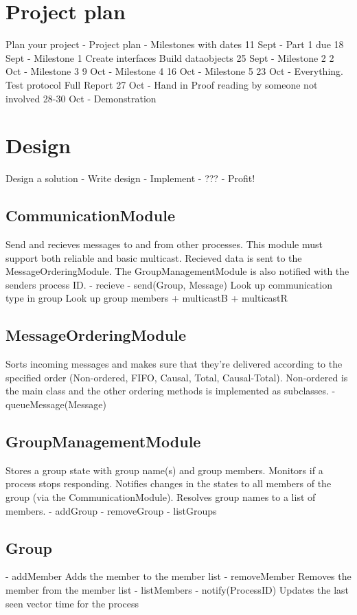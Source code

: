 \documentclass[11pt,swedish]{article}
\begin{document}
\section{Project plan}
Plan your project
- Project plan
- Milestones with dates
	11 Sept		- Part 1 due
	18 Sept		- Milestone 1
					Create interfaces
					Build dataobjects
	25 Sept		- Milestone 2
	2 Oct		- Milestone 3
	9 Oct		- Milestone 4
	16 Oct		- Milestone 5
	23 Oct		- Everything.
		Test protocol
		Full Report
	27 Oct 		- Hand in
		Proof reading by someone not involved
	28-30 Oct 	- Demonstration

\section{Design}
Design a solution
- Write design
- Implement
- ???
- Profit!


\subsection{CommunicationModule}
Send and recieves messages to and from other processes. This module must support both reliable and basic multicast. Recieved data is sent to the MessageOrderingModule. The GroupManagementModule is also notified with the senders process ID. 
- recieve
- send(Group, Message)
	Look up communication type in group
	Look up group members
+ multicastB
+ multicastR


\subsection{MessageOrderingModule}
Sorts incoming messages and makes sure that they're delivered according to the specified order (Non-ordered, FIFO, Causal, Total, Causal-Total). Non-ordered is the main class and the other ordering methods is implemented as subclasses. 
- queueMessage(Message)


\subsection{GroupManagementModule}
Stores a group state with group name(s) and group members. Monitors if a process stops responding. Notifies changes in the states to all members of the group (via the CommunicationModule). Resolves group names to a list of members.
- addGroup
- removeGroup
- listGroups

\subsection{Group}
- addMember
	Adds the member to the member list
- removeMember
	Removes the member from the member list
- listMembers
- notify(ProcessID)
	Updates the last seen vector time for the process
\end{document}
